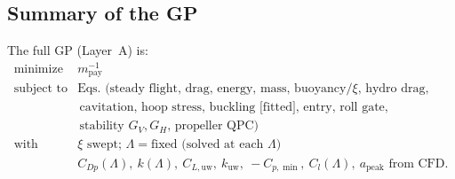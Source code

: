 \documentclass{new-aiaa}
\begin{document}
\subsection{Summary of the GP}
The full GP (Layer~A) is:
\begin{equation}\label{eq:gpsummary}
\begin{array}{ll}
\text{minimize}    & m_{\text{pay}}^{-1} \\
\text{subject to} & \text{Eqs. (steady flight, drag, energy, mass, buoyancy/$\xi$, hydro drag,} \\
                  & \hspace{2pt}\text{cavitation, hoop stress, buckling [fitted], entry, roll gate,} \\
	                  & \hspace{2pt}\text{stability $G_V,G_H$, propeller QPC)} \\
\text{with}        & \text{$\xi$ swept; $\Lambda=\text{fixed}$ (solved at each $\Lambda$)} \\
                  & C_{Dp}(\Lambda),\ k(\Lambda),\ C_{L,\text{uw}},\ k_{\text{uw}},\ -C_{p,\min},\ C_l(\Lambda),\ a_{\text{peak}} \text{ from CFD}.
\end{array}
\end{equation}
\end{document}

